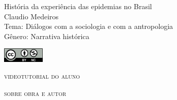 \documentclass[smaller,professionalfonts,15pt]{beamer}
\begin{document}
										\begin{frame}\begin{raggedleft}
										\Huge 
História da experiência das epidemias no Brasil						\\
										\huge 
Claudio Medeiros						\\
										\bigskip
										\normalsize
Tema: Diálogos com a sociologia e com a antropologia		\\	
Gênero: Narrativa histórica									\\\vfill
\publishername
										\end{raggedleft}

\smallskip\includegraphics[width=2cm]{ccbync.png}\hfill
\end{frame}


\begin{frame}{\textsc{videotutorial do aluno}}
\vspace{-2cm}\begin{figure}
\hfill{}
\end{figure}
\end{frame}


\begin{frame}
\hfill\Huge
\textsc{sobre obra e autor}
\end{frame}
\end{document}
